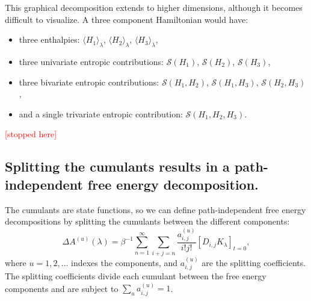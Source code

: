 \documentclass{article}
\newcommand{\warning}[1]{{\textsf{{\textcolor{red}{{[#1]}{}}}}}}
\begin{document}
This graphical decomposition extends to higher dimensions, although it becomes difficult to visualize. A three component Hamiltonian would have:
\begin{itemize}
	\item three enthalpies: $\langle H_1 \rangle_\lambda$, $\langle H_2 \rangle_\lambda$, $\langle H_3 \rangle_\lambda$,
	\item three univariate entropic contributions: $\mathcal{S}(H_1)$, $\mathcal{S}(H_2)$, $\mathcal{S}(H_3)$,
	\item three bivariate entropic contributions: $\mathcal{S}(H_1, H_2)$, $\mathcal{S}(H_1, H_3)$, $\mathcal{S}(H_2, H_3)$, 
	\item and a single trivariate entropic contribution: $\mathcal{S}(H_1, H_2, H_3)$.
\end{itemize}

\warning{stopped here}

\clearpage






\subsection{Splitting the cumulants results in a path-independent free energy decomposition.}

The cumulants are state functions, so we can define path-independent free energy decompositions by splitting the cumulants between the different components:
\begin{equation}
\Delta A^{(u)}(\lambda) =
	\beta^{-1} \sum_{n=1}^{\infty}
	\sum_{i+j=n}
	\frac{a_{i,j}^{(u)}}{i!j!}\left[ D_{i,j} K_\lambda\right]_{t=0},
\end{equation}
where $u=1, 2, \ldots$ indexes the components, and $a_{i,j}^{(u)}$ are the splitting coefficients. The splitting coefficients divide each cumulant between the free energy components and are subject to $\sum_u a_{i,j}^{(u)}=1$.
\end{document}

